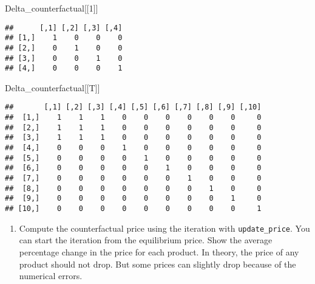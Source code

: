 \documentclass[
]{book}
\newenvironment{Shaded}{\begin{snugshade}}{\end{snugshade}}
\newcommand{\DecValTok}[1]{\textcolor[rgb]{0.00,0.00,0.81}{#1}}
\newcommand{\NormalTok}[1]{#1}
\providecommand{\tightlist}{%
  \setlength{\itemsep}{0pt}\setlength{\parskip}{0pt}}
\begin{document}
\begin{Shaded}
\begin{Highlighting}[]
\NormalTok{Delta_counterfactual[[}\DecValTok{1}\NormalTok{]]}
\end{Highlighting}
\end{Shaded}

\begin{verbatim}
##      [,1] [,2] [,3] [,4]
## [1,]    1    0    0    0
## [2,]    0    1    0    0
## [3,]    0    0    1    0
## [4,]    0    0    0    1
\end{verbatim}

\begin{Shaded}
\begin{Highlighting}[]
\NormalTok{Delta_counterfactual[[T]]}
\end{Highlighting}
\end{Shaded}

\begin{verbatim}
##       [,1] [,2] [,3] [,4] [,5] [,6] [,7] [,8] [,9] [,10]
##  [1,]    1    1    1    0    0    0    0    0    0     0
##  [2,]    1    1    1    0    0    0    0    0    0     0
##  [3,]    1    1    1    0    0    0    0    0    0     0
##  [4,]    0    0    0    1    0    0    0    0    0     0
##  [5,]    0    0    0    0    1    0    0    0    0     0
##  [6,]    0    0    0    0    0    1    0    0    0     0
##  [7,]    0    0    0    0    0    0    1    0    0     0
##  [8,]    0    0    0    0    0    0    0    1    0     0
##  [9,]    0    0    0    0    0    0    0    0    1     0
## [10,]    0    0    0    0    0    0    0    0    0     1
\end{verbatim}

\begin{enumerate}
\def\labelenumi{\arabic{enumi}.}
\setcounter{enumi}{1}
\tightlist
\item
  Compute the counterfactual price using the iteration with \texttt{update\_price}. You can start the iteration from the equilibrium price. Show the average percentage change in the price for each product. In theory, the price of any product should not drop. But some prices can slightly drop because of the numerical errors.
\end{enumerate}
\end{document}
